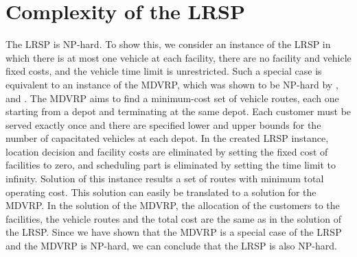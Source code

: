 \section{Complexity of the LRSP}
The LRSP is NP-hard. To show this, we consider an instance of the LRSP 
in which there is at most one vehicle at each facility, there are 
no facility and vehicle fixed costs, and the vehicle time limit is 
unrestricted. Such a special case is equivalent to an instance of 
the MDVRP, which was shown to be NP-hard by  \citet{Lenstra},
and \citet{Bodin2}.
The MDVRP aims to find a minimum-cost set of vehicle routes, each 
one starting from a depot and terminating at the same depot. Each 
customer must be served exactly once and there are specified lower and 
upper bounds for the number of capacitated vehicles at each depot. 
In the created LRSP instance, location decision and facility costs are 
eliminated by setting the fixed cost of facilities to zero, and scheduling
part is eliminated by setting the time limit to infinity. Solution of this
instance results a set of routes with minimum total operating 
cost.
This solution can easily be translated to a solution for the MDVRP. 
In the solution of the MDVRP, the allocation of the customers to the facilities, 
the vehicle routes and the total cost are the same as in the solution of the LRSP. 
Since we have shown that the MDVRP is a special case of the LRSP and the 
MDVRP is NP-hard, we can conclude that the LRSP is also NP-hard. 
 



